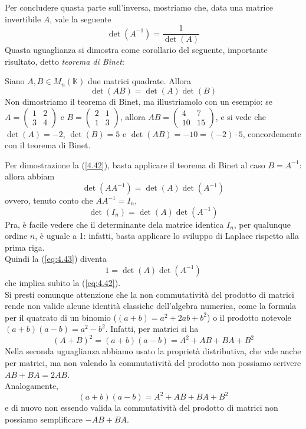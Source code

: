 Per concludere quasta parte sull'inversa, mostriamo che, data una matrice invertibile $A$, vale la seguente
\begin{equation}
  \label{eq:4.42}
  \det(A^{-1})=\frac{1}{\det(A)}
\end{equation}
Quasta uguaglianza si dimostra come corollario del seguente, importante risultato, detto \textit{teorema di
  Binet}:
\begin{teorema}
  Siano $A,B\in M_n(\mathds{K})$ due matrici quadrate. Allora
  \begin{equation*}
    \det(AB)=\det(A)\det(B)
  \end{equation*}
  Non dimostriamo il teorema di Binet, ma illustriamolo con un esempio: se $A=
  \begin{pmatrix}
    1 & 2 \\
    3 & 4
  \end{pmatrix}
  $ e $B=
  \begin{pmatrix}
    2 &1\\
    1 & 3
  \end{pmatrix}
  $, allora $AB=
  \begin{pmatrix}
    4 & 7\\
    10 & 15
  \end{pmatrix}
  $, e si vede che $\det (A)=-2$, $\det (B)=5$ e $\det(AB)=-10=(-2)\cdot 5$, concordemente con il teorema di
  Binet.
\end{teorema}
Per dimostrazione la (\ref{4.42}), basta applicare il teorema di Binet al caso
$B=A^{-1}$:\\
allora abbiam
\begin{equation*}
  \det(AA^{-1})=\det(A)\det(A^{-1})
\end{equation*}
ovvero, tenuto conto che $AA^{-1}=I_n$,
\begin{equation}
  \label{eq:4.43}
  \det(I_n)=\det(A)\det(A^{-1})
\end{equation}
Pra, è facile vedere che il determinante dela matrice identica $I_n$, per
qualunque ordine $n$, è uguale a 1: infatti, basta applicare lo sviluppo di
Laplace rispetto alla prima riga.\\
Quindi la (\ref{eq:4.43}) diventa
\begin{equation*}
  1=\det(A)\det(A^{-1})
\end{equation*}
che implica subito la (\ref{eq:4.42}).\\
Si presti comunque attenzione che la non commutatività del prodotto di matrici rende non
valide alcune identità classiche dell'algebra numerica, come la formula per il quatrato di
un binomio ($(a+b)=a^2+2ab+b^2$) o il prodotto notevole $(a+b)(a-b)=a^2-b^2$. Infatti, per
matrici si ha 
\begin{equation*}
  (A+B)^2=(a+b)(a-b)=A^2+AB+BA+B^2
\end{equation*}
Nella seconda uguaglianza abbiamo usato la proprietà distributiva, che vale anche per
matrici, ma non valendo la commutatività del prodotto non possiamo scrivere $AB+BA=2AB$.\\
Analogamente,
\begin{equation*}
  (a+b)(a-b)=A^2+AB+BA+B^2
\end{equation*}
e di nuovo non essendo valida la commutatività del prodotto di matrici non possiamo
semplificare $-AB+BA$.

